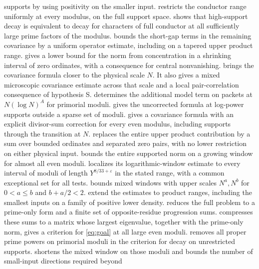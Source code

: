 \documentclass[11pt,a4paper]{article}
\numberwithin{equation}{section}
\begin{document}
supports by using positivity on the smaller input.
 restricts the conductor range
uniformly at every modulus, on the full support space.
 shows that high-support
decay is equivalent to decay for characters of full conductor
at all sufficiently large prime factors of the modulus.
 bounds the short-gap terms in
the remaining covariance by a uniform operator estimate,
including on a tapered upper product range.
 gives a lower bound
for the norm from concentration in a shrinking interval of
zero ordinates, with a consequence for central nonvanishing.
 brings the covariance formula
closer to the physical scale $N$. It also gives a mixed
microscopic covariance estimate across that scale and a
local pair-correlation consequence of hypothesis S.
 determines the additional model
term on packets at $N(\log N)^A$ for primorial moduli.
 gives the uncorrected
formula at log-power supports outside a sparse set of moduli.
 gives a covariance formula with
an explicit divisor-sum correction for every even modulus,
including supports through the transition at $N$.
 replaces the entire upper product
contribution by a sum over bounded ordinates and separated
zero pairs, with no lower restriction on either physical input.
 bounds the entire supported norm on a growing
window for almost all even moduli.
 localizes its logarithmic-window
estimate to every interval of moduli of length $Y^{8/33+\varepsilon}$
in the stated range, with a common exceptional set for all tests.
 bounds mixed windows with upper scales
$N^a,N^b$ for $0<a\le b$ and $b+a/2<2$.
 extend the estimates
to product ranges, including the smallest inputs
on a family of positive lower density.
 reduces the full problem to a prime-only form
and a finite set of opposite-residue progression sums.
 compresses these sums to a matrix
whose largest eigenvalue, together with the prime-only norm,
gives a criterion for \eqref{eq:goal} at all large even moduli.
 removes all proper prime powers on primorial
moduli in the criterion for decay on unrestricted supports.
 shortens the mixed window on those moduli
and bounds the number of small-input directions required beyond
\end{document}
